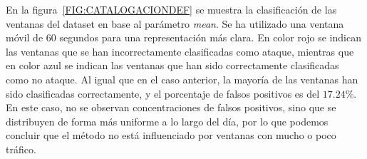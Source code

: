 En la figura~\ref{FIG:CATALOGACIONDEF} se muestra la clasificación de las ventanas del dataset en base al parámetro \textit{mean}. Se ha utilizado una ventana móvil de 60 segundos para una representación más clara.
En color rojo se indican las ventanas que se han incorrectamente clasificadas como ataque, mientras que en color azul se indican las ventanas que han sido correctamente clasificadas como no ataque.
Al igual que en el caso anterior, la mayoría de las ventanas han sido clasificadas correctamente, y el porcentaje de falsos positivos es del $17.24\%$.
En este caso, no se observan concentraciones de falsos positivos, sino que se distribuyen de forma más uniforme a lo largo del día, por lo que podemos concluir que el método no está influenciado por ventanas con mucho o poco tráfico.
